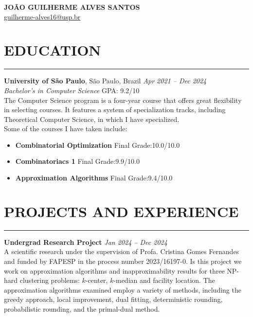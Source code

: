 \documentclass[a4paper,10pt]{article}
\begin{document}
\begin{center}
    {\LARGE \textbf{JOÃO GUILHERME ALVES SANTOS}} \\
    \vspace{0.2cm}
    \href{mailto:guilherme-alves16@usp.br}{guilherme-alves16@usp.br}

\end{center}

\section*{EDUCATION}
\vspace{-1.5em} %
\noindent\rule{\textwidth}{0.4pt} %

\noindent\textbf{University of São Paulo}, São Paulo, Brazil \hfill  \textit{Apr 2021 -- Dec 2024} \\
\textit{Bachelor's in Computer Science} \hfill GPA: 9.2/10 \\
The Computer Science program is a four-year course that offers great flexibility in selecting courses. It features a system of specialization tracks, including Theoretical Computer Science, in which I have specialized. \\
Some of the courses I have taken include:
\begin{itemize}[leftmargin=0.3cm]
\item \textbf{Combinatorial Optimization} \hfill Final Grade:\@ 10.0/10.0
\item \textbf{Combinatoriacs 1 } \hfill Final Grade:\@ 9.9/10.0
\item \textbf{Approximation Algorithms} \hfill Final Grade:\@ 9.4/10.0
\end{itemize}


\section*{PROJECTS AND EXPERIENCE}
\vspace{-1.5em} %
\noindent\rule{\textwidth}{0.4pt} %

\noindent\textbf{Undergrad Research Project}  \hfill  \textit{Jan 2024 -- Dec 2024} \\
A scientific research under the supervision of Profa. Cristina Gomes Fernandes and funded by FAPESP in the 
process number 2023/16197-0. Is this project we work on approximation algorithms and inapproximability results for three NP-hard clustering problems: $k$-center, $k$-median and facility location. The approximation algorithms examined employ a variety of methods, including the greedy approach, local improvement, dual fitting, deterministic rounding, probabilistic rounding, and the primal-dual method.\\
\end{document}
